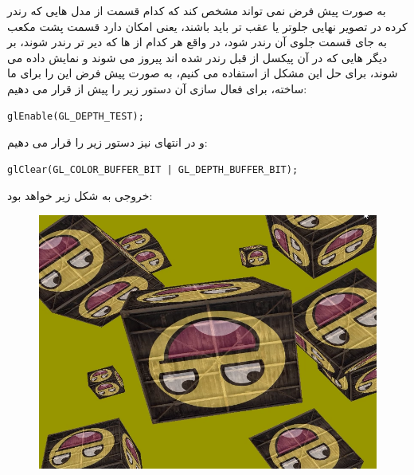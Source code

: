 \documentclass[a4paper, 12pt]{report}
\newcommand{\lrit}[1]{\lr{\textit{#1}}}
\begin{document}
    به صورت پیش فرض  نمی تواند مشخص کند که کدام قسمت از مدل هایی که رندر کرده در تصویر نهایی جلوتر یا عقب تر باید باشند، یعنی امکان دارد قسمت پشت مکعب به جای قسمت جلوی آن رندر شود، در واقع هر کدام از  ها که دیر تر رندر شوند، بر دیگر  هایی که در آن پیکسل از قبل رندر شده اند پیروز می شوند و نمایش داده می شوند، برای حل این مشکل از  استفاده می کنیم،  به صورت پیش فرض این  را برای ما ساخته، برای فعال سازی آن دستور زیر را پیش از  قرار می دهیم:

    \begin{LTR}
    \small
        \begin{lstlisting}[style=C++Style,caption=\lrit{enabling depth buffer}]
glEnable(GL_DEPTH_TEST);
        \end{lstlisting}
    \end{LTR}
    \normalsize
    \vspace*{0.3cm}

    و در انتهای  نیز دستور زیر را قرار می دهیم:

        \begin{LTR}
    \small
        \begin{lstlisting}[style=C++Style,caption=\lrit{clearing depth buffer for next frame}]
glClear(GL_COLOR_BUFFER_BIT | GL_DEPTH_BUFFER_BIT);
        \end{lstlisting}
    \end{LTR}
    \normalsize
    \vspace*{0.3cm}

    خروجی به شکل زیر خواهد بود:
    \begin{figure}[ht]
    \centering
    \href{https://github.com/devprofile98/shm}{
        \includegraphics[width=13cm]{images/3d.png}
    }
    \caption{\fontsize{11pt}{1.0cm}\zarbold\textbf{}}
    \label{fig:my_label}
\end{figure}
\end{document}
